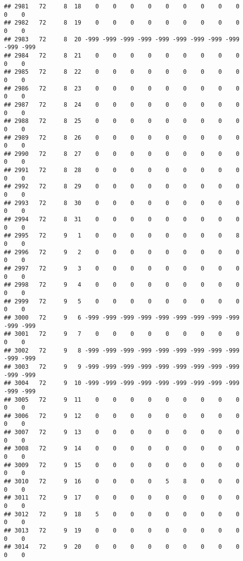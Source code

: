 \documentclass[]{article}
\begin{document}
\begin{verbatim}
## 2981   72     8  18    0    0    0    0    0    0    0    0    0    0    0
## 2982   72     8  19    0    0    0    0    0    0    0    0    0    0    0
## 2983   72     8  20 -999 -999 -999 -999 -999 -999 -999 -999 -999 -999 -999
## 2984   72     8  21    0    0    0    0    0    0    0    0    0    0    0
## 2985   72     8  22    0    0    0    0    0    0    0    0    0    0    0
## 2986   72     8  23    0    0    0    0    0    0    0    0    0    0    0
## 2987   72     8  24    0    0    0    0    0    0    0    0    0    0    0
## 2988   72     8  25    0    0    0    0    0    0    0    0    0    0    0
## 2989   72     8  26    0    0    0    0    0    0    0    0    0    0    0
## 2990   72     8  27    0    0    0    0    0    0    0    0    0    0    0
## 2991   72     8  28    0    0    0    0    0    0    0    0    0    0    0
## 2992   72     8  29    0    0    0    0    0    0    0    0    0    0    0
## 2993   72     8  30    0    0    0    0    0    0    0    0    0    0    0
## 2994   72     8  31    0    0    0    0    0    0    0    0    0    0    0
## 2995   72     9   1    0    0    0    0    0    0    0    0    8    0    0
## 2996   72     9   2    0    0    0    0    0    0    0    0    0    0    0
## 2997   72     9   3    0    0    0    0    0    0    0    0    0    0    0
## 2998   72     9   4    0    0    0    0    0    0    0    0    0    0    0
## 2999   72     9   5    0    0    0    0    0    0    0    0    0    0    0
## 3000   72     9   6 -999 -999 -999 -999 -999 -999 -999 -999 -999 -999 -999
## 3001   72     9   7    0    0    0    0    0    0    0    0    0    0    0
## 3002   72     9   8 -999 -999 -999 -999 -999 -999 -999 -999 -999 -999 -999
## 3003   72     9   9 -999 -999 -999 -999 -999 -999 -999 -999 -999 -999 -999
## 3004   72     9  10 -999 -999 -999 -999 -999 -999 -999 -999 -999 -999 -999
## 3005   72     9  11    0    0    0    0    0    0    0    0    0    0    0
## 3006   72     9  12    0    0    0    0    0    0    0    0    0    0    0
## 3007   72     9  13    0    0    0    0    0    0    0    0    0    0    0
## 3008   72     9  14    0    0    0    0    0    0    0    0    0    0    0
## 3009   72     9  15    0    0    0    0    0    0    0    0    0    0    0
## 3010   72     9  16    0    0    0    0    5    8    0    0    0    0    0
## 3011   72     9  17    0    0    0    0    0    0    0    0    0    0    0
## 3012   72     9  18    5    0    0    0    0    0    0    0    0    0    0
## 3013   72     9  19    0    0    0    0    0    0    0    0    0    0    0
## 3014   72     9  20    0    0    0    0    0    0    0    0    0    0    0

\end{verbatim}
\end{document}
